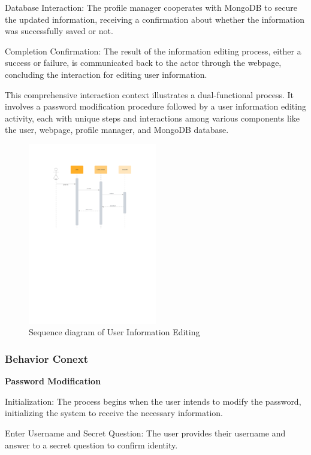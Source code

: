 \documentclass[conference]{IEEEtran}
\begin{document}
Database Interaction: The profile manager cooperates with MongoDB to secure the updated information, receiving a confirmation about whether the information was successfully saved or not.

Completion Confirmation: The result of the information editing process, either a success or failure, is communicated back to the actor through the webpage, concluding the interaction for editing user information.

This comprehensive interaction context illustrates a dual-functional process. It involves a password modification procedure followed by a user information editing activity, each with unique steps and interactions among various components like the user, webpage, profile manager, and MongoDB database.
\begin{figure}[htbp]
	\centerline{\includegraphics[width=0.5\textwidth]{Diagram_of_Editing_Info_and_Password/Sequence_diagram_of_editing_info.pdf}}
	\caption{Sequence diagram of User Information Editing }
	\label{Sequence_diagram_of_editing_info}
\end{figure}
\subsubsection{\textbf{Behavior Conext }}
\textbf{ }

\textbf{ Password Modification}

Initialization: The process begins when the user intends to modify the password, initializing the system to receive the necessary information.

Enter Username and Secret Question: The user provides their username and answer to a secret question to confirm identity.
\end{document}
